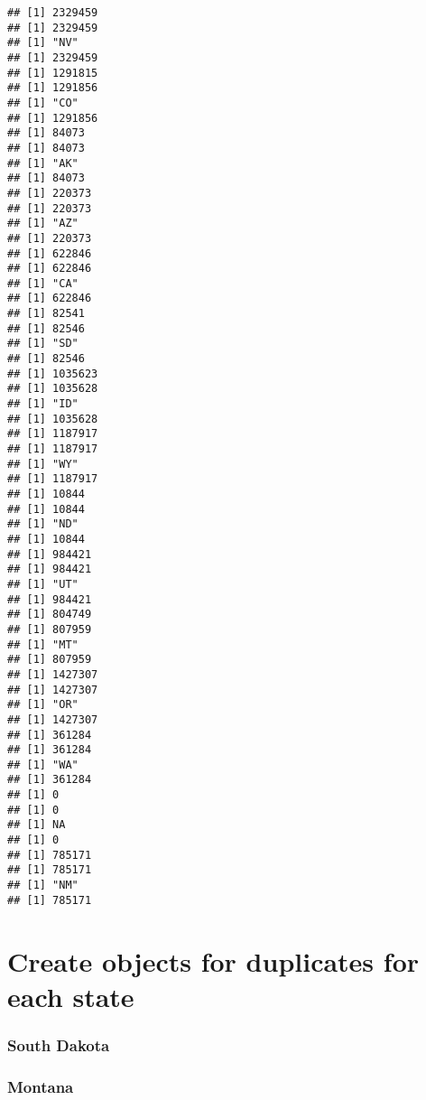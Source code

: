 \documentclass[
]{book}
\newenvironment{Shaded}{\begin{snugshade}}{\end{snugshade}}
\newcommand{\KeywordTok}[1]{\textcolor[rgb]{0.13,0.29,0.53}{\textbf{#1}}}
\newcommand{\NormalTok}[1]{#1}
\newcommand{\OperatorTok}[1]{\textcolor[rgb]{0.81,0.36,0.00}{\textbf{#1}}}
\newcommand{\StringTok}[1]{\textcolor[rgb]{0.31,0.60,0.02}{#1}}
\begin{document}
\begin{verbatim}
## [1] 2329459
## [1] 2329459
## [1] "NV"
## [1] 2329459
## [1] 1291815
## [1] 1291856
## [1] "CO"
## [1] 1291856
## [1] 84073
## [1] 84073
## [1] "AK"
## [1] 84073
## [1] 220373
## [1] 220373
## [1] "AZ"
## [1] 220373
## [1] 622846
## [1] 622846
## [1] "CA"
## [1] 622846
## [1] 82541
## [1] 82546
## [1] "SD"
## [1] 82546
## [1] 1035623
## [1] 1035628
## [1] "ID"
## [1] 1035628
## [1] 1187917
## [1] 1187917
## [1] "WY"
## [1] 1187917
## [1] 10844
## [1] 10844
## [1] "ND"
## [1] 10844
## [1] 984421
## [1] 984421
## [1] "UT"
## [1] 984421
## [1] 804749
## [1] 807959
## [1] "MT"
## [1] 807959
## [1] 1427307
## [1] 1427307
## [1] "OR"
## [1] 1427307
## [1] 361284
## [1] 361284
## [1] "WA"
## [1] 361284
## [1] 0
## [1] 0
## [1] NA
## [1] 0
## [1] 785171
## [1] 785171
## [1] "NM"
## [1] 785171
\end{verbatim}

\hypertarget{create-objects-for-duplicates-for-each-state}{%
\section{Create objects for duplicates for each state}\label{create-objects-for-duplicates-for-each-state}}

\hypertarget{south-dakota}{%
\subsubsection{South Dakota}\label{south-dakota}}

\begin{Shaded}
\end{Shaded}

\hypertarget{montana}{%
\subsubsection{Montana}\label{montana}}

\begin{Shaded}
\end{Shaded}
\end{document}
